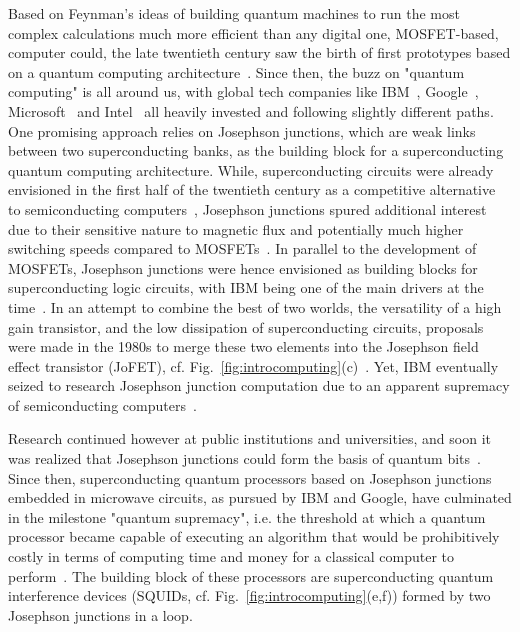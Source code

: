 Based on Feynman's ideas of building quantum machines to run the most complex calculations much more efficient than any digital one, MOSFET-based, computer could, the late twentieth century saw the birth of first prototypes based on a quantum computing architecture~\cite{feynmanSimulatingPhysicsComputers1982}.
%
Since then, the buzz on "quantum computing" is all around us, with global tech companies like IBM~\cite{steffenQuantumComputingIBM2011}, Google~\cite{aruteQuantumSupremacyUsing2019}, Microsoft~\cite{linnNewMicrosoftBreakthroughs2020} and Intel~\cite{vandersypenQuantumComputingSemiconductor2019} all heavily invested and following slightly different paths.
%
One promising approach relies on Josephson junctions, which are weak links between two superconducting banks, as the building block for a superconducting quantum computing architecture.
%
While, superconducting circuits were already envisioned in the first half of the twentieth century as a competitive alternative to semiconducting computers~\cite{brockWillNSAFinally}, Josephson junctions spured additional interest due to their sensitive nature to magnetic flux and potentially much higher switching speeds compared to MOSFETs~\cite{josephsonPossibleNewEffects1962,andersonProbableObservationJosephson1963}.
%
In parallel to the development of MOSFETs, Josephson junctions were hence envisioned as building blocks for superconducting logic circuits, with IBM being one of the main drivers at the time~\cite{anackerJosephsonComputerTechnology1980a}.
%
In an attempt to combine the best of two worlds, the versatility of a high gain transistor, and the low dissipation of superconducting circuits, proposals were made in the 1980s to merge these two elements into the Josephson field effect transistor (JoFET), cf. Fig.~\ref{fig:introcomputing}(c)~\cite{clarkFeasibilityHybridJosephson1980,gallagherThreeterminalSuperconductingDevices1985}.
%
Yet, IBM eventually seized to research Josephson junction computation due to an apparent supremacy of semiconducting computers~\cite{robinsonIBMDropsSuperconducting1983}.

Research continued however at public institutions and universities, and soon it was realized that Josephson junctions could form the basis of quantum bits~\cite{martinisQuantumJosephsonJunction2020}.
%
Since then, superconducting quantum processors based on Josephson junctions embedded in microwave circuits, as pursued by IBM and Google, have culminated in the milestone "quantum supremacy", i.e. the threshold at which a quantum processor became capable of executing an algorithm that would be prohibitively costly in terms of computing time and money for a classical computer to perform~\cite{aruteQuantumSupremacyUsing2019}.
%
The building block of these processors are superconducting quantum interference devices (SQUIDs, cf. Fig.~\ref{fig:introcomputing}(e,f)) formed by two Josephson junctions in a loop.

